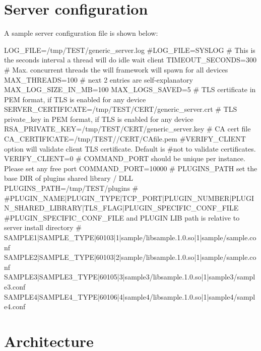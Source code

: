 \par
 \par
 \hypertarget{index_SE}{}\section{Server configuration}\label{index_SE}

\begin{DoxyPre}
        A sample server configuration file is shown below:\end{DoxyPre}



\begin{DoxyPre}        LOG\_FILE=/tmp/TEST/generic\_server.log
        #LOG\_FILE=SYSLOG
        \# This is the seconds interval a thread will do idle wait client
        TIMEOUT\_SECONDS=300
        \# Max. concurrent threads the will framework will spawn for all devices
        MAX\_THREADS=100
        \# next 2 entries are self-explanatory
        MAX\_LOG\_SIZE\_IN\_MB=100
        MAX\_LOGS\_SAVED=5
        \# TLS certificate in PEM format, if TLS is enabled for any device
        SERVER\_CERTIFICATE=/tmp/TEST/CERT/generic\_server.crt
        \# TLS private\_key in PEM format, if TLS is enabled for any device
        RSA\_PRIVATE\_KEY=/tmp/TEST/CERT/generic\_server.key
        \# CA cert file
        CA\_CERTIFICATE=/tmp/TEST//CERT/CAfile.pem
        #VERIFY\_CLIENT option will validate client TLS certificate. Default is
        #not to validate certificates. 
        VERIFY\_CLIENT=0
        \# COMMAND\_PORT should be unique per instance. Please set any free port 
        COMMAND\_PORT=10000
        \# PLUGINS\_PATH set the base DIR of plugins shared library / DLL
        PLUGINS\_PATH=/tmp/TEST/plugins
        \#
        #PLUGIN\_NAME|PLUGIN\_TYPE|TCP\_PORT|PLUGIN\_NUMBER|PLUGIN\_SHARED\_LIBRARY|TLS\_FLAG|PLUGIN\_SPECIFIC\_CONF\_FILE
        #PLUGIN\_SPECIFIC\_CONF\_FILE and PLUGIN LIB path is relative to server install directory
        \#
        SAMPLE1|SAMPLE\_TYPE|60103|1|sample/libsample.1.0.so|1|sample/sample.conf
        SAMPLE2|SAMPLE\_TYPE|60103|2|sample/libsample.1.0.so|1|sample/sample.conf
        SAMPLE3|SAMPLE3\_TYPE|60105|3|sample3/libsample.1.0.so|1|sample3/sample3.conf
        SAMPLE4|SAMPLE4\_TYPE|60106|4|sample4/libsample.1.0.so|1|sample4/sample4.conf
\end{DoxyPre}
 \par
 \par
 \hypertarget{index_AR}{}\section{Architecture}\label{index_AR}
